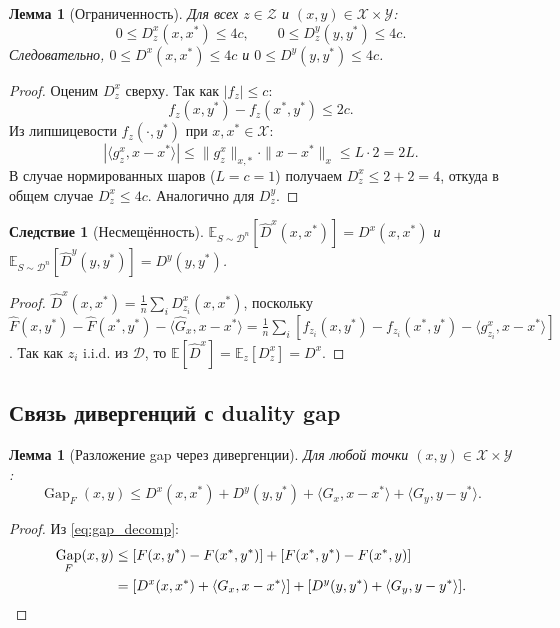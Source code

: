 \documentclass[12pt,a4paper]{article}
\theoremstyle{plain}
\newtheorem{lemma}[theorem]{Лемма}
\newtheorem{corollary}[theorem]{Следствие}
\theoremstyle{definition}
\DeclareMathOperator{\Gap}{Gap}
\newcommand{\E}{\mathbb{E}}
\newcommand{\cX}{\mathcal{X}}
\newcommand{\cY}{\mathcal{Y}}
\newcommand{\cZ}{\mathcal{Z}}
\newcommand{\cD}{\mathcal{D}}
\newcommand{\hatF}{\hat{F}}
\newcommand{\hatD}{\hat{D}}
\newcommand{\hatG}{\hat{G}}
\begin{document}
\begin{lemma}[Ограниченность]
\label{lem:bounded}
Для всех $z\in\cZ$ и $(x,y)\in\cX\times\cY$:
\[
    0\le D_z^x(x,x^*)\le 4c,\qquad 0\le D_z^y(y,y^*)\le 4c.
\]
Следовательно, $0\le D^x(x,x^*)\le 4c$ и $0\le D^y(y,y^*)\le 4c$.
\end{lemma}

\begin{proof}
Оценим $D_z^x$ сверху. Так как $|f_z|\le c$:
\[
    f_z(x,y^*)-f_z(x^*,y^*)\le 2c.
\]
Из липшицевости $f_z(\cdot,y^*)$ при $x,x^*\in\cX$:
\[
    |\langle g_z^x,x-x^*\rangle|\le\|g_z^x\|_{x,*}\cdot\|x-x^*\|_x\le L\cdot 2=2L.
\]
В случае нормированных шаров ($L=c=1$) получаем $D_z^x\le 2+2=4$, откуда в общем случае $D_z^x\le 4c$. Аналогично для $D_z^y$.
\end{proof}

\begin{corollary}[Несмещённость]
\label{cor:unbiased}
$\E_{S\sim\cD^n}[\hatD^x(x,x^*)]=D^x(x,x^*)$ и $\E_{S\sim\cD^n}[\hatD^y(y,y^*)]=D^y(y,y^*)$.
\end{corollary}

\begin{proof}
$\hatD^x(x,x^*)=\frac{1}{n}\sum_i D_{z_i}^x(x,x^*)$, поскольку $\hatF(x,y^*)-\hatF(x^*,y^*)-\langle\hatG_x,x-x^*\rangle=\frac{1}{n}\sum_i[f_{z_i}(x,y^*)-f_{z_i}(x^*,y^*)-\langle g_{z_i}^x,x-x^*\rangle]$. Так как $z_i$ i.i.d. из $\cD$, то $\E[\hatD^x]=\E_z[D_z^x]=D^x$.
\end{proof}

\subsection{Связь дивергенций с duality gap}

\begin{lemma}[Разложение gap через дивергенции]
\label{lem:gap_bregman}
Для любой точки $(x,y)\in\cX\times\cY$:
\[
    \Gap_F(x,y)\le D^x(x,x^*)+D^y(y,y^*)+\langle G_x,x-x^*\rangle+\langle G_y,y-y^*\rangle.
\]
\end{lemma}

\begin{proof}
Из \eqref{eq:gap_decomp}:
\begin{align*}
    \Gap_F(x,y)
    &\le [F(x,y^*)-F(x^*,y^*)]+[F(x^*,y^*)-F(x^*,y)]\\
    &=[D^x(x,x^*)+\langle G_x,x-x^*\rangle]+[D^y(y,y^*)+\langle G_y,y-y^*\rangle].\qedhere
\end{align*}
\end{proof}
\end{document}
